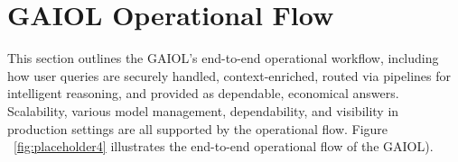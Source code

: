 \documentclass[final,5p,times,twocolumn,authoryear,draft]{elsarticle}
\begin{document}



\clearpage %


\section{GAIOL Operational Flow}


This section outlines the GAIOL's end-to-end operational workflow, including how user queries are securely handled, context-enriched, routed via pipelines for intelligent reasoning, and provided as dependable, economical answers. Scalability, various model management, dependability, and visibility in production settings are all supported by the operational flow. Figure ~\ref{fig:placeholder4} illustrates the end-to-end operational flow of the GAIOL).



        
\end{document}
